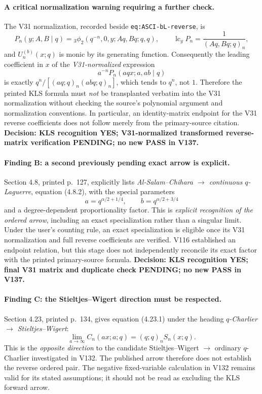 \documentclass[11pt]{article}
\begin{document}
\paragraph{A critical normalization warning requiring a further check.}
The V31 normalization, recorded beside \texttt{eq:ASCI-bL-reverse}, is
\[
 P_n(y;A,B\mid q)={}_3\phi_2(q^{-n},0,y;Aq,Bq;q,q),
 \qquad \operatorname{lc}_yP_n=\frac1{(Aq,Bq;q)_n},
\]
and $U_n^{(b)}(x;q)$ is monic by its generating function. Consequently the leading coefficient in $x$ of the \emph{V31-normalized} expression
\[
 a^{-n}P_n(aqx;a,ab\mid q)
\]
is exactly $q^n/[(aq;q)_n(abq;q)_n]$, which tends to $q^n$, not $1$.
Therefore the printed KLS formula must \emph{not} be transplanted verbatim into the V31 normalization without checking the source's polynomial argument and normalization conventions.  In particular, an identity-matrix endpoint for the V31 reverse coefficients does not follow merely from the primary-source citation.  \textbf{Decision: KLS recognition YES; V31-normalized transformed reverse-matrix verification PENDING; no new PASS in V137.}

\paragraph{Finding B: a second previously pending exact arrow is explicit.}
Section 4.8, printed p.~127, explicitly lists
\emph{Al-Salam--Chihara $\longrightarrow$ continuous $q$-Laguerre}, equation (4.8.2), with the special parameters
\[
 a=q^{\alpha/2+1/4},\qquad b=q^{\alpha/2+3/4}
\]
and a degree-dependent proportionality factor.  This is \emph{explicit recognition of the ordered arrow}, including an exact specialization rather than a singular limit.  Under the user's counting rule, an exact specialization is eligible once its V31 normalization and full reverse coefficients are verified.  V116 established an endpoint relation, but this stage does not independently reconcile its exact factor with the printed primary-source formula.  \textbf{Decision: KLS recognition YES; final V31 matrix and duplicate check PENDING; no new PASS in V137.}

\paragraph{Finding C: the Stieltjes--Wigert direction must be respected.}
Section 4.23, printed p.~134, gives equation (4.23.1) under the heading
\emph{$q$-Charlier $\longrightarrow$ Stieltjes--Wigert}:
\[
 \lim_{a\to\infty}C_n(ax;a;q)=(q;q)_nS_n(x;q).
\]
This is the \emph{opposite direction} to the candidate
Stieltjes--Wigert $\longrightarrow$ ordinary $q$-Charlier investigated in V132.  The published arrow therefore does not establish the reverse ordered pair.  The negative fixed-variable calculation in V132 remains valid for its stated assumptions; it should not be read as excluding the KLS forward arrow.
\end{document}
